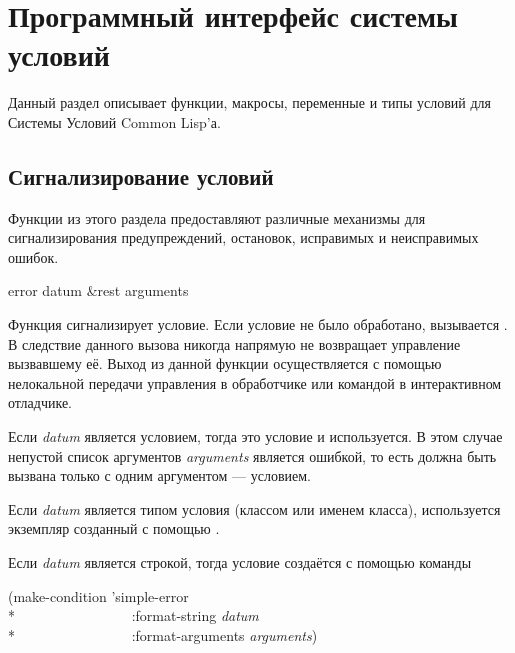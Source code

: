 \section{Программный интерфейс системы условий}

Данный раздел описывает функции, макросы, переменные и типы условий для Системы
Условий Common Lisp'а.

\subsection{Сигнализирование условий}
\label{SIGNALLING-CONDITIONS}

Функции из этого раздела предоставляют различные механизмы для сигнализирования
предупреждений, остановок, исправимых и неисправимых ошибок.

\begin{defun}[Функция]
error datum &rest arguments

Функция сигнализирует условие. Если условие не было обработано, вызывается
. В следствие данного вызова 
никогда напрямую не возвращает управление вызвавшему её. Выход из данной функции
осуществляется с помощью нелокальной передачи управления в обработчике или
командой в интерактивном отладчике.

Если \emph{datum} является условием, тогда это условие и используется.
В этом случае непустой список аргументов \emph{arguments} является ошибкой, то
есть  должна быть вызвана только с одним аргументом --- условием.

Если \emph{datum} является типом условия (классом или именем класса),
используется экземпляр созданный с помощью .

Если \emph{datum} является строкой, тогда условие создаётся с помощью команды
\begin{lisp}
(make-condition 'simple-error \\*
~~~~~~~~~~~~~~~~:format-string \emph{datum} \\*
~~~~~~~~~~~~~~~~:format-arguments \emph{arguments})
\end{lisp}
\end{defun}

